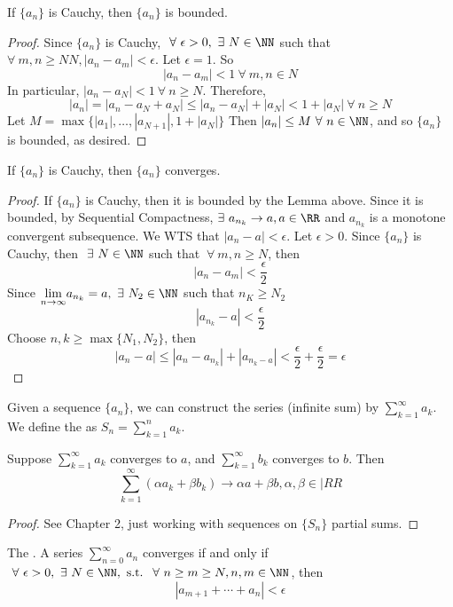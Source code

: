 \documentclass[12pt]{scrartcl}
\begin{document}
\begin{lemma}
  If $\{a_n\}$ is Cauchy, then $\{a_n\}$ is bounded. 

  \begin{proof}
    Since $\{a_n\}$ is Cauchy, $\ \forall \ \epsilon > 0, \ \exists \ N \in \NN$ such that 
    $\forall \ m, n \geq NN, |a_n - a_m| < \epsilon$. Let $\epsilon = 1$. So 
    \[|a_n - a_m| < 1 \ \forall \ m, n \in N\]
    In particular, $|a_n - a_N| < 1 \ \forall \ n \geq N$. Therefore, 
    \[|a_n| = |a_n - a_N + a_N| \leq |a_n - a_N| + |a_N| < 1 + |a_N| \ \forall \ n \geq N\]
    Let $M =\max\{|a_1|, \ldots, |a_{N+1}|, 1 + |a_N|\}$
    Then $|a_n| \leq M \ \forall \ n \in \NN$, and so $\{a_n\}$ is bounded, as desired.
  \end{proof}
\end{lemma}

\begin{theorem}
  If $\{a_n\}$ is Cauchy, then $\{a_n\}$ converges. 

  \begin{proof}
    If $\{a_n\}$ is Cauchy, then it is bounded by the Lemma above. Since it is bounded, by Sequential Compactness, 
    $\exists \ a_{n_k} \to a, a \in \RR$ and $a_{n_k}$ is a monotone convergent subsequence. We 
    WTS that $|a_n - a| < \epsilon$. Let $\epsilon > 0$. Since $\{a_n\}$ is Cauchy, then $\ \exists \ N \in \NN$ such that 
    $\ \forall \ m,n \geq N$, then 
    \[|a_n - a_m| < \frac{\epsilon}{2}\]
    Since $\underset{n\to\infty}{\lim} a_{n_k} = a, \ \exists \ N_2 \in \NN$ such that $n_K \geq N_2$
    \[|a_{n_k} - a| < \frac{\epsilon}{2}\]
    Choose $n, k \geq \max\{N_1, N_2\}$, then 
    \[|a_n - a| \leq |a_n - a_{n_k}| + |a_{n_k - a}| < \frac{\epsilon}{2} + \frac{\epsilon}{2} = \epsilon\]
  \end{proof}
\end{theorem}

\begin{definition}
  Given a sequence $\{a_n\}$, we can construct the series (infinite sum) by $\sum_{k=1}^\infty a_k$. We define the 
   as $S_n = \sum_{k=1}^n a_k$.
\end{definition}

\begin{theorem}
  Suppose $\sum_{k=1}^\infty a_k$ converges to $a$, and $\sum_{k=1}^\infty b_k$ converges to $b$. 
  Then 
  \[\sum_{k=1}^\infty (\alpha a_k + \beta b_k) \to \alpha a + \beta b, \alpha, \beta \in |RR\]
  \begin{proof}
    See Chapter 2, just working with sequences on $\{S_n\}$ partial sums.
  \end{proof}
\end{theorem}

\begin{theorem}
  The . A series $\sum_{n=0}^\infty a_n$ converges 
  if and only if $\ \forall \ \epsilon > 0, \ \exists \ N \in \NN, \text{ s.t. } \ \forall \ n \geq m \geq N, n,m \in \NN$, then 
  \[|a_{m+1} + \cdots + a_n| < \epsilon\]
\end{theorem}
\end{document}
